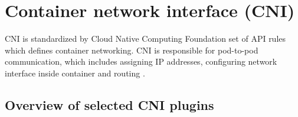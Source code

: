 
\section{Container network interface (CNI)}
\label{sec:cni}
CNI is standardized by Cloud Native Computing Foundation set of API rules which defines container networking. CNI is responsible for pod-to-pod communication, which includes assigning IP addresses, configuring network interface inside container and routing \cite{IBMKubernetesNetworking}. 




\subsection{Overview of selected CNI plugins}
\label{sec:cni_overview}


